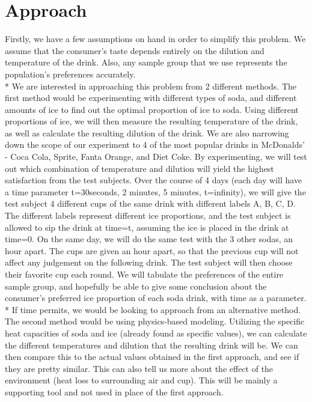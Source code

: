 \documentclass[12pt,letterpaper]{article}
\theoremstyle{definition}
\begin{document}
\section{Approach}
Firstly, we have a few assumptions on hand in order to simplify this problem. We assume that the consumer's taste depends entirely on the dilution and temperature of the drink. Also, any sample group that we use represents the population's preferences accurately.
\\* We are interested in approaching this problem from 2 different methods. The first method would be experimenting with different types of soda, and different amounts of ice to find out the optimal proportion of ice to soda. Using different proportions of ice, we will then measure the resulting temperature of the drink, as well as calculate the resulting dilution of the drink. We are also narrowing down the scope of our experiment to 4 of the most popular drinks in McDonalds' - Coca Cola, Sprite, Fanta Orange, and Diet Coke. By experimenting, we will test out which combination of temperature and dilution will yield the highest satisfaction from the test subjects. Over the course of 4 days (each day will have a time parameter t=30seconds, 2 minutes, 5 minutes, t=infinity), we will give the test subject 4 different cups of the same drink with different labels A, B, C, D. The different labels represent different ice proportions, and the test subject is allowed to sip the drink at time=t, assuming the ice is placed in the drink at time=0. On the same day, we will do the same test with the 3 other sodas, an hour apart. The cups are given an hour apart, so that the previous cup will not affect any judgement on the following drink. The test subject will then choose their favorite cup each round. We will tabulate the preferences of the entire sample group, and hopefully be able to give some conclusion about the consumer's preferred ice proportion of each soda drink, with time as a parameter.
\\* If time permits, we would be looking to approach from an alternative method. The second method would be using physics-based modeling. Utilizing the specific heat capacities of soda and ice (already found as specific values), we can calculate the different temperatures and dilution that the resulting drink will be. We can then compare this to the actual values obtained in the first approach, and see if they are pretty similar. This can also tell us more about the effect of the environment (heat loss to surrounding air and cup). This will be mainly a supporting tool and not used in place of the first approach.
\end{document}
